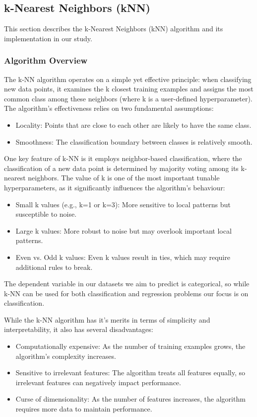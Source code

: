 \subsection{k-Nearest Neighbors (kNN)}
\label{subsec:methods-knn}

This section describes the k-Nearest Neighbors (kNN) algorithm and its implementation in our study.

\subsubsection{Algorithm Overview}

The k-NN algorithm operates on a simple yet effective principle: when classifying new data points, 
it examines the k closest training examples and assigns the most common class among these neighbors (where k is a user-defined hyperparameter). 
The algorithm's effectiveness relies on two fundamental assumptions:
\begin{itemize}
    \item Locality: Points that are close to each other are likely to have the same class.
    \item Smoothness: The classification boundary between classes is relatively smooth.
\end{itemize}

One key feature of k-NN is it employs neighbor-based classification, where the classification of a new data point 
is determined by majority voting among its k-nearest neighbors. 
The value of k is one of the most important tunable hyperparameters, as it significantly influences the algorithm's behaviour:
\begin{itemize}
    \item Small k values (e.g., k=1 or k=3): More sensitive to local patterns but susceptible to noise.
    \item Large k values: More robust to noise but may overlook important local patterns.
    \item Even vs. Odd k values: Even k values result in ties, which may require additional rules to break.
\end{itemize}

The dependent variable in our datasets we aim to predict is categorical, so while k-NN can be used for both classification and regression problems 
our focus is on classification.

While the k-NN algorithm has it's merits in terms of simplicity and interpretability, it also has several disadvantages:
\begin{itemize}
    \item Computationally expensive: As the number of training examples grows, the algorithm's complexity increases\cite{laviale2023}.
    \item Sensitive to irrelevant features: The algorithm treats all features equally, so irrelevant features can negatively impact performance.
    \item Curse of dimensionality: As the number of features increases, the algorithm requires more data to maintain performance.
\end{itemize}

